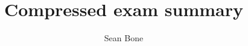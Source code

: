 \documentclass[a4paper, 8pt]{extarticle}
\title{Compressed exam summary}
\author{Sean Bone}
\begin{document}
\begin{multicols*}{3}


\end{multicols*}
\end{document}
